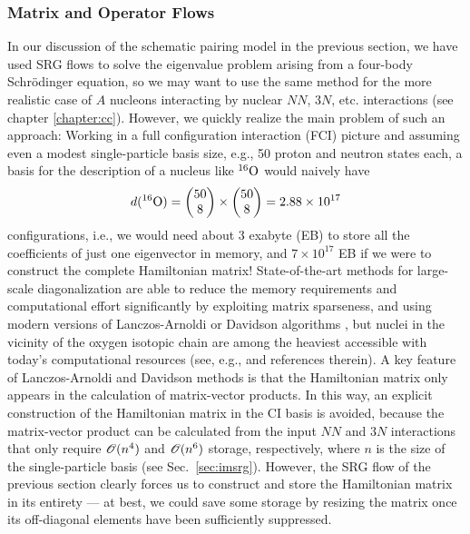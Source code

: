 {\subsubsection{\label{sec:srg_opflow}Matrix and Operator Flows}
In our discussion of the schematic pairing model in the previous section, we 
have used SRG flows to solve the eigenvalue problem arising from a four-body 
Schr\"odinger equation, so we may want to use the same method for the more 
realistic case of $A$ nucleons interacting by nuclear $NN$, $3N$, etc. 
interactions (see chapter \ref{chapter:cc}). However, we quickly realize the
main problem of such an approach: Working in a full configuration interaction (FCI) 
picture
and assuming even a modest single-particle basis size, e.g., 50 proton and neutron 
states each, a basis for the description of a nucleus like $\nuc{O}{16}$ would 
naively have
\begin{equation}
 d(\nuc{O}{16}) = \begin{pmatrix} 50 \\ 8\end{pmatrix} \times 
           \begin{pmatrix} 50 \\ 8\end{pmatrix}
                = 2.88\times10^{17}
\end{equation}
configurations, i.e., we would need about 3 exabyte (EB) to store all the coefficients
of just one eigenvector in memory, and $7\times10^{17}$ EB if we were to construct
the complete Hamiltonian matrix! State-of-the-art methods for large-scale 
diagonalization are able to reduce the memory requirements and computational
effort significantly by exploiting matrix sparseness, and using modern versions of
Lanczos-Arnoldi \cite{Lanczos:1950sp,Arnoldi:1951kk} or Davidson algorithms 
\cite{Davidson:1989pi}, but nuclei in the vicinity of the oxygen isotopic 
chain are among the heaviest accessible with today's computational
resources (see, e.g., \cite{Yang:2013ly,Barrett:2013oq} and references therein).
A key feature of Lanczos-Arnoldi and Davidson methods is that the
Hamiltonian matrix only appears in the calculation
of matrix-vector products. In this way, an explicit construction of the Hamiltonian
matrix in the CI basis is avoided, because the matrix-vector product can be
calculated from the input $NN$ and $3N$ interactions that only require $\OC(n^4)$ 
and $\OC(n^6)$ storage, respectively, where $n$ is the size of the single-particle
basis (see Sec.~\ref{sec:imsrg}). However, the SRG flow of the previous section 
clearly forces us to construct
and store the Hamiltonian matrix in its entirety --- at best, we could save some
storage by resizing the matrix once its off-diagonal elements have been 
sufficiently suppressed.

}
